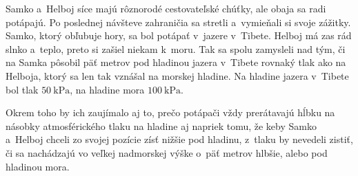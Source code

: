 Samko a~Helboj síce majú rôznorodé cestovateľské chúťky, ale obaja sa radi potápajú.
Po poslednej návšteve zahraničia sa stretli a~vymieňali si svoje zážitky. Samko, ktorý obľubuje hory, sa bol potápať v~jazere v~Tibete.
Helboj má zas rád slnko a~teplo, preto si zašiel niekam k~moru. Tak sa spolu zamysleli nad tým, či na Samka pôsobil päť metrov pod hladinou
jazera v~Tibete rovnaký tlak ako na Helboja, ktorý sa len tak vznášal na morskej hladine.
Na hladine jazera v~Tibete bol tlak $\SI{50}{\kilo\pascal}$, na hladine mora $\SI{100}{\kilo\pascal}$.

Okrem toho by ich zaujímalo aj to, prečo potápači vždy prerátavajú hĺbku na násobky atmosférického tlaku
na hladine aj napriek tomu, že keby Samko a~Helboj chceli zo svojej pozície zísť nižšie pod hladinu,
z~tlaku by nevedeli zistiť, či sa nachádzajú vo veľkej nadmorskej výške o~päť metrov hlbšie, alebo pod hladinou mora. 
